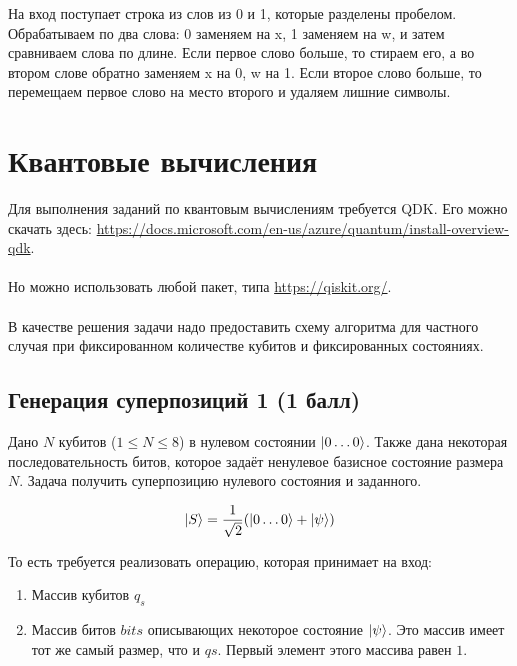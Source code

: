 \documentclass[a4paper,12pt]{article}
\begin{document}
На вход поступает строка из слов из 0 и 1, которые разделены пробелом. Обрабатываем по два слова: 0 заменяем на x, 1 заменяем на w, и затем сравниваем слова по длине. Если первое слово больше, то стираем его, а во втором слове обратно заменяем x на 0, w на 1. Если второе слово больше, то перемещаем первое слово на место второго и удаляем лишние символы.






















\section{Квантовые вычисления}

Для выполнения заданий по квантовым вычислениям требуется QDK. Его можно скачать здесь: \url{https://docs.microsoft.com/en-us/azure/quantum/install-overview-qdk}. 
\\\\
Но можно использовать любой пакет, типа \url{https://qiskit.org/}. 
\\\\
В качестве решения задачи надо предоставить схему алгоритма для частного случая при фиксированном количестве кубитов и фиксированных состояниях. 






\subsection{Генерация суперпозиций 1 (1 балл)}

Дано $N$ кубитов ($1 \le N \le 8$) в нулевом состоянии $\Ket{0\dots0}$. Также дана некоторая последовательность битов, которое задаёт ненулевое базисное состояние размера $N$. Задача получить суперпозицию нулевого состояния и заданного.

$$\Ket{S} = \frac{1}{\sqrt2}(\Ket{0\dots0} +\Ket{\psi})$$

То есть требуется реализовать операцию, которая принимает на вход:

\begin{enumerate}
    \item Массив кубитов $q_s$
    \item Массив битов $bits$ описывающих некоторое состояние $\Ket{\psi}$. Это массив имеет тот же самый размер, что и $qs$. Первый элемент этого массива равен $1$.
\end{enumerate}
\end{document}
